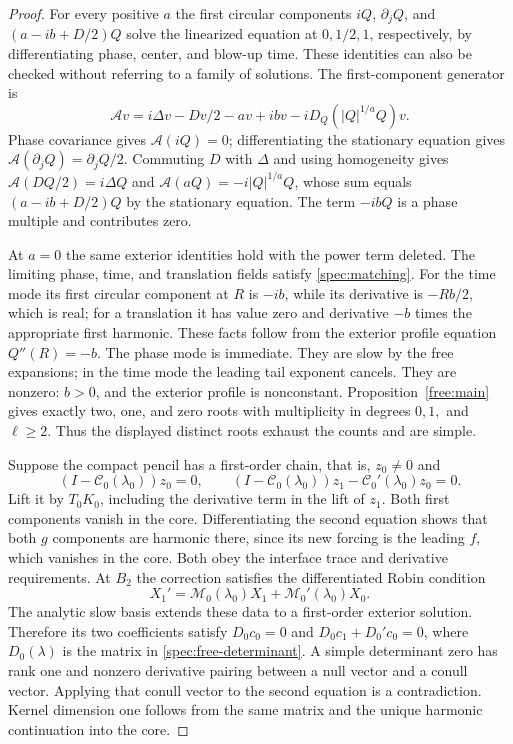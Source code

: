 \documentclass[11pt]{article}
\numberwithin{equation}{section}
\theoremstyle{definition}
\theoremstyle{remark}
\begin{document}
\begin{proof}
For every positive $a$ the first circular components
$iQ$, $\partial_jQ$, and $(a-ib+D/2)Q$ solve the linearized equation
at $0,1/2,1$, respectively, by differentiating phase, center, and
blow-up time. These identities can also be checked without referring
to a family of solutions. The first-component generator is
\[
 \mathcal A v=i\Delta v-Dv/2-av+ibv-iD_Q(|Q|^{1/a}Q)v.
\]
Phase covariance gives $\mathcal A(iQ)=0$; differentiating the
stationary equation gives $\mathcal A(\partial_jQ)=\partial_jQ/2$.
Commuting $D$ with $\Delta$ and using homogeneity gives
$\mathcal A(DQ/2)=i\Delta Q$ and
$\mathcal A(aQ)=-i|Q|^{1/a}Q$, whose sum equals
$(a-ib+D/2)Q$ by the stationary equation. The term $-ibQ$ is a phase
multiple and contributes zero.

At $a=0$ the same exterior identities hold with the power term
deleted. The limiting phase, time, and translation fields satisfy
\eqref{spec:matching}. For the time mode its first circular component
at $R$ is $-ib$, while its derivative is $-Rb/2$, which is real;
for a translation it has value zero and derivative $-b$ times the
appropriate first harmonic. These facts follow from the exterior
profile equation $Q''(R)=-b$. The phase mode is immediate.
They are slow by the free expansions; in the time mode the leading
tail exponent cancels. They are nonzero: $b>0$, and the exterior
profile is nonconstant. Proposition~\ref{free:main} gives exactly
two, one, and zero roots with multiplicity in degrees $0,1,$ and
$\ell\ge2$. Thus the displayed distinct roots exhaust the counts
and are simple.

Suppose the compact pencil has a first-order chain, that is,
$z_0\ne0$ and
\[
 (I-\mathcal C_0(\lambda_0))z_0=0,\qquad
 (I-\mathcal C_0(\lambda_0))z_1
       -\mathcal C_0'(\lambda_0)z_0=0.
\]
Lift it by $T_0K_0$, including the derivative term in the lift of
$z_1$. Both first components vanish in the core. Differentiating the
second equation shows that both $g$ components are harmonic there,
since its new forcing is the leading $f$, which vanishes in the core.
Both obey the interface trace and derivative requirements. At $B_2$
the correction satisfies the differentiated Robin condition
\[
 X_1'=\mathcal M_0(\lambda_0)X_1
                 +\mathcal M_0'(\lambda_0)X_0.
\]
The analytic slow basis extends these data to a first-order exterior
solution. Therefore its two coefficients satisfy
$D_0c_0=0$ and $D_0c_1+D_0'c_0=0$, where $D_0(\lambda)$ is the
matrix in \eqref{spec:free-determinant}. A simple determinant zero
has rank one and nonzero derivative pairing between a null vector
and a conull vector. Applying that conull vector to the second
equation is a contradiction. Kernel dimension one follows from the
same matrix and the unique harmonic continuation into the core.
\end{proof}
\end{document}
